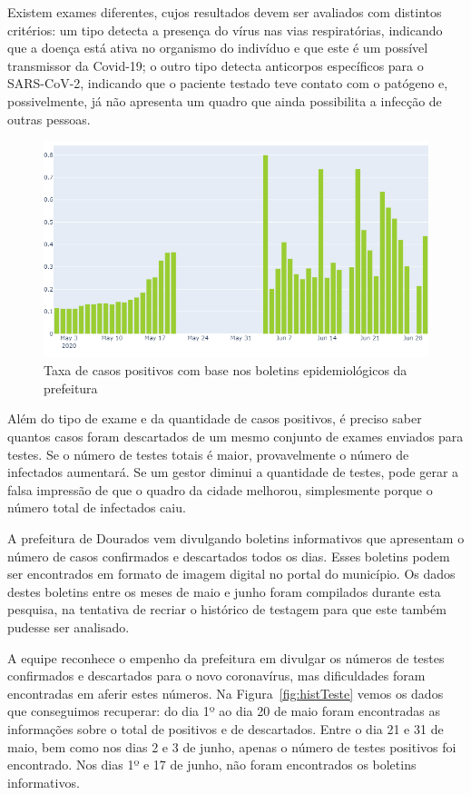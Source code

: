 \documentclass[12pt]{article}
\begin{document}
Existem exames diferentes, cujos resultados devem ser avaliados com distintos critérios: um tipo detecta a presença do vírus nas vias respiratórias, indicando que a doença está ativa no organismo do indivíduo e que este é um possível transmissor da Covid-19; o outro tipo detecta anticorpos específicos para o SARS-CoV-2, indicando que o paciente testado teve contato com o patógeno e, possivelmente, já não apresenta um quadro que ainda possibilita a infecção de outras pessoas.

\begin{figure}[!htb]
  \centering
  \includegraphics[width=.75\textwidth]{figs/taxa_positivo.png}
  \caption{Taxa de casos positivos com base nos boletins epidemiológicos da prefeitura}
  \label{fig:positTaxa}
  \end{figure}


Além do tipo de exame e da quantidade de casos positivos, é preciso saber quantos casos foram descartados de um mesmo conjunto de exames enviados para testes. Se o número de testes totais é maior, provavelmente o número de infectados aumentará. Se um gestor diminui a quantidade de testes, pode gerar a falsa impressão de que o quadro da cidade melhorou, simplesmente porque o número total de infectados caiu.

A prefeitura de Dourados vem divulgando boletins informativos que apresentam o número de casos confirmados e descartados todos os dias. Esses boletins podem ser encontrados em formato de imagem digital no portal do município. Os dados destes boletins entre os meses de maio e junho foram compilados durante esta pesquisa, na tentativa de recriar o histórico de testagem para que este também pudesse ser analisado.

A equipe reconhece o empenho da prefeitura em divulgar os números de testes confirmados e descartados para o novo coronavírus, mas dificuldades foram encontradas em aferir estes números. Na Figura~\ref{fig:histTeste} vemos os dados que conseguimos recuperar: do dia 1º ao dia 20 de maio foram encontradas as informações sobre o total de positivos e de descartados. Entre o dia 21 e 31 de maio, bem como nos dias 2 e 3 de junho, apenas o número de testes positivos foi encontrado. Nos dias 1º e 17 de junho, não foram encontrados os boletins informativos.
\end{document}
